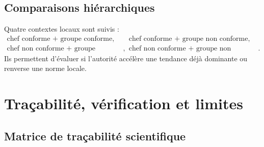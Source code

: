 \documentclass[11pt,a4paper]{article}
\begin{document}
\subsection{Comparaisons hiérarchiques}

Quatre contextes locaux sont suivis :
\[
\begin{array}{ll}
\text{chef conforme + groupe conforme},&
\text{chef conforme + groupe non conforme},\\
\text{chef non conforme + groupe conforme},&
\text{chef non conforme + groupe non conforme}.
\end{array}
\]
Ils permettent d’évaluer si l’autorité accélère une tendance déjà dominante ou
renverse une norme locale.

\section{Traçabilité, vérification et limites}

\subsection{Matrice de traçabilité scientifique}
\end{document}

